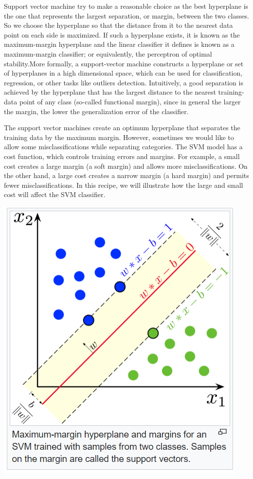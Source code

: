 \documentclass[
]{report}
\begin{document}
Support vector machine try to make a reasonable choice as the best hyperplane is the one that represents the largest separation, or margin, between the two classes. So we choose the hyperplane so that the distance from it to the nearest data point on each side is maximized. If such a hyperplane exists, it is known as the maximum-margin hyperplane and the linear classifier it defines is known as a maximum-margin classifier; or equivalently, the perceptron of optimal stability.More formally, a support-vector machine constructs a hyperplane or set of hyperplanes in a high dimensional space, which can be used for classification, regression, or other tasks like outliers detection. Intuitively, a good separation is achieved by the hyperplane that has the largest distance to the nearest training-data point of any class (so-called functional margin), since in general the larger the margin, the lower the generalization error of the classifier.

The support vector machines create an optimum hyperplane that separates the training data by the maximum margin. However, sometimes we would like to allow some misclassifications while separating categories. The SVM model has a cost function, which controls training errors and margins. For example, a small cost creates a large margin (a soft margin) and allows more misclassifications. On the other hand, a large cost creates a narrow margin (a hard margin) and permits fewer misclassifications. In this recipe, we will illustrate how the large and small cost will affect the SVM classifier.

\begin{center}\includegraphics{svm} \end{center}
\end{document}
